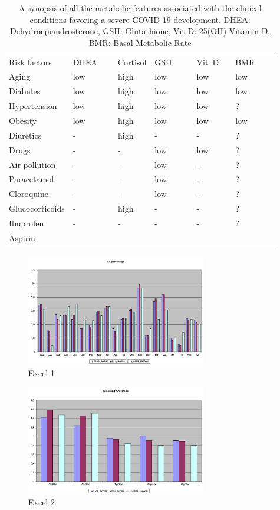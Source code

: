 \documentclass[graybox]{svmult}
\begin{document}
\begin{table}[t]
\center
\begin{tabular}{llllll}
\hline\noalign{\smallskip}
Risk factors~~~ & DHEA~~~ &	Cortisol & GSH~~~~ & Vit~D~~ & BMR~~~~ \\
\noalign{\smallskip}\svhline\noalign{\smallskip}
Aging & low & high & low & low & low \\
Diabetes & low & high & low & low & low \\
Hypertension & low & high & low & low & ? \\
Obesity & low & high & low & low & low \\
Diuretics & - & high & - & - & ? \\
Drugs & - & - & low & low & ? \\
Air pollution & - & - & low & - & ? \\
Paracetamol & - & - & low & - & ? \\
Cloroquine & - & - & low & - & ? \\
Glucocorticoids & - & high & - & - & ? \\
Ibuprofen & - & - & - & - & ? \\
Aspirin	\\
\hline\noalign{\smallskip}
\end{tabular}
\caption{A synopsis of all the metabolic features associated with the clinical conditions favoring a severe COVID-19 development. DHEA: Dehydroepiandrosterone, GSH: Glutathione, Vit D: 25(OH)-Vitamin D, BMR: Basal Metabolic Rate}
\label{riskFactors}
\end{table}


\begin{figure}[t]
\center
\includegraphics[width=0.7\textwidth]{R1AB_R1A_ACE2_ch1.png}
\caption{Excel 1}
\label{ch1}
\end{figure}

\begin{figure}[t]
\center
\includegraphics[width=0.7\textwidth]{R1AB_R1A_ACE2_ch2.png}
\caption{Excel 2}
\label{ch2}
\end{figure}
\end{document}
